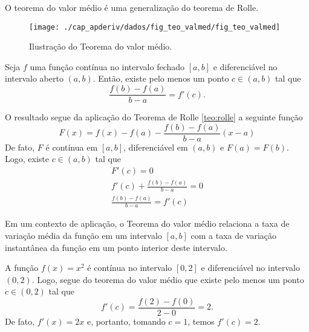 O teorema do valor médio é uma generalização do teorema de Rolle.

\begin{figure}[H]
  \centering
  \texttt{[image: ./cap\_apderiv/dados/fig\_teo\_valmed/fig\_teo\_valmed]}
  \caption{Ilustração do Teorema do valor médio.}
  \label{fig:teo_valor_medio}
\end{figure}

\begin{teo}\label{teo:tvm}
  Seja $f$ uma função contínua no intervalo fechado $[a,b]$ e diferenciável no intervalo aberto $(a,b)$. Então, existe pelo menos um ponto $c\in (a,b)$ tal que
  \begin{equation}
    \frac{f(b)-f(a)}{b-a}=f'(c).
  \end{equation}
\end{teo}
\begin{dem}
  O resultado segue da aplicação do Teorema de Rolle \ref{teo:rolle} a seguinte função
  \begin{equation}
    F(x) = f(x) - f(a) - \frac{f(b) - f(a)}{b-a}(x-a)
  \end{equation}
  De fato, $F$ é contínua em $[a, b]$, diferenciável em $(a, b)$ e $F(a) = F(b)$. Logo, existe $c\in (a, b)$ tal que
  \begin{gather}
    F'(c) = 0\\
    f'(c) + \frac{f(b) - f(a)}{b-a} = 0\\
    \frac{f(b) - f(a)}{b-a} = f'(c)
  \end{gather}
\end{dem}

\begin{obs}
  Em um contexto de aplicação, o Teorema do valor médio relaciona a taxa de variação média da função em um intervalo $[a, b]$ com a taxa de variação instantânea da função em um ponto interior deste intervalo.
\end{obs}

\begin{ex}
  A função $f(x)=x^2$ é contínua no intervalo $[0,2]$ e diferenciável no intervalo $(0,2)$. Logo, segue do teorema do valor médio que existe pelo menos um ponto $c\in (0,2)$ tal que
  \begin{equation}
    f'(c)=\frac{f(2)-f(0)}{2-0}=2.
  \end{equation}
  De fato, $f'(x)=2x$ e, portanto, tomando $c=1$, temos $f'(c)=2$.
\end{ex}

